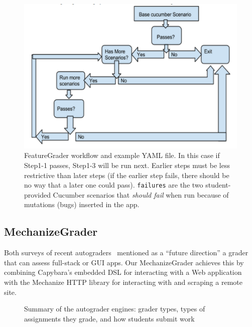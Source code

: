 \begin{figure}
  \begin{minipage}{0.45\textwidth}%
  \includegraphics[width=\textwidth]{figs/feature_grader.pdf}%
  \end{minipage}%
  \begin{minipage}{0.55\textwidth}%
  \end{minipage}
  \caption{\label{fig:cucumber}%
FeatureGrader workflow and example YAML file.  In this case if Step1-1 passes,
Step1-3 will be run next.  Earlier steps must be less restrictive than
later steps (if the earlier step fails, there should be no way that a later one could pass).
\texttt{failures} are the two student-provided Cucumber scenarios that \emph{should fail} when
run because of mutations (bugs) inserted in the app.
}
\end{figure}

\subsection{MechanizeGrader}

Both surveys of recent
autograders~\cite{ihantola-2010-autograder-survey,douce-2005-autograder-survey} mentioned as
a ``future direction'' a grader that can assess full-stack or GUI apps.
Our MechanizeGrader achieves this by combining Capybara's embedded DSL
for interacting with a Web application with the Mechanize HTTP library
for interacting with and scraping a remote site.




\begin{figure}
  \caption{\label{fig:grader_summary} Summary of the autograder
    engines: grader types, types of assignments they grade, and
    how students submit work}
\end{figure}


